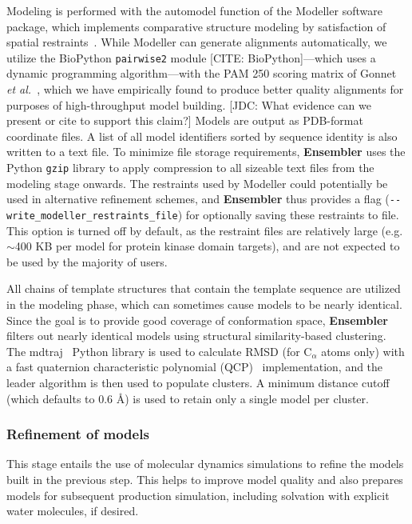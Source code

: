 \documentclass[aps,pre,twocolumn,nofootinbib,superscriptaddress,linenumbers]{revtex4-1}
\begin{document}
Modeling is performed with the automodel function of the Modeller software package, which implements comparative structure modeling by satisfaction of spatial restraints~\cite{fiser:prot-sci:2000:modeller,sali:jmb:1993:modeller}.
While Modeller can generate alignments automatically, we utilize the BioPython {\tt pairwise2} module [CITE: BioPython]---which uses a dynamic programming algorithm---with the PAM 250 scoring matrix of Gonnet \textit{et al.}~\cite{gonnet:science:1992:exhaustive-matching}, which we have empirically found to produce better quality alignments for purposes of high-throughput model building.
{\color{red}[JDC: What evidence can we present or cite to support this claim?]}
Models are output as PDB-format coordinate files.
A list of all model identifiers sorted by sequence identity is also written to a text file.
To minimize file storage requirements, {\bf Ensembler} uses the Python {\tt gzip} library to apply compression to all sizeable text files from the modeling stage onwards.
The restraints used by Modeller could potentially be used in alternative refinement schemes, and {\bf Ensembler} thus provides a flag ({\tt -{}-write\_modeller\_restraints\_file}) for optionally saving these restraints to file.
This option is turned off by default, as the restraint files are relatively large (e.g.~$\sim$400 KB per model for protein kinase domain targets), and are not expected to be used by the majority of users.

All chains of template structures that contain the template sequence are utilized in the modeling phase, which can sometimes cause models to be nearly identical.
Since the goal is to provide good coverage of conformation space, {\bf Ensembler} filters out nearly identical models using structural similarity-based clustering.
The mdtraj~\cite{mdtraj} Python library is used to calculate RMSD (for C$_\alpha$ atoms only) with a fast quaternion characteristic polynomial (QCP)~\cite{theobald:acta-cryst-a:2005:qcp,theobald:j-comput-chem:2010:qcp,theobald:j-comput-chem:2011:qcp} implementation, and the leader algorithm is then used to populate clusters.
A minimum distance cutoff (which defaults to 0.6 \AA) is used to retain only a single model per cluster.

\subsubsection*{Refinement of models}

This stage entails the use of molecular dynamics simulations to refine the models built in the previous step.
This helps to improve model quality and also prepares models for subsequent production simulation, including solvation with explicit water molecules, if desired.
\end{document}
